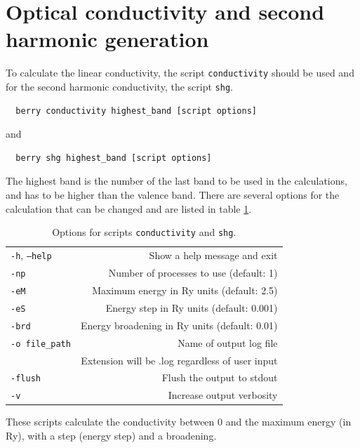 \documentclass[a4paper,12pt]{report}
\begin{document}
\section{Optical conductivity and second harmonic generation}

To calculate the linear conductivity, the script \texttt{conductivity} should be used
and for the second harmonic conductivity, the script \texttt{shg}.
\begin{verbatim}
  berry conductivity highest_band [script options]
 \end{verbatim}
 and
 \begin{verbatim}
  berry shg highest_band [script options]
 \end{verbatim}

The highest band is the number of the last band to be used in the calculations,
and has to be higher than the valence band.
There are several options for the calculation that can be changed and are listed in
table \ref{tab:options_conductivity}.


\begin{table}[ht]
 \centering
 \caption{Options for scripts \texttt{conductivity} and \texttt{shg}.}\label{tab:options_conductivity}
\begin{tabular}[]{lr}
\hline
  \texttt{-h}, \texttt{--help}  & Show a help message and exit \\
  \texttt{-np}                  & Number of processes to use (default: 1) \\
  \texttt{-eM}                  & Maximum energy in Ry units (default: 2.5) \\
  \texttt{-eS}                  & Energy step in Ry units (default: 0.001) \\
  \texttt{-brd}                 & Energy broadening in Ry units (default: 0.01) \\
  \texttt{-o file\_path}        & Name of output log file\\
                                & Extension will be .log regardless of user input\\
  \texttt{-flush}               & Flush the output to stdout \\
  \texttt{-v}                   & Increase output verbosity \\
  \hline
\end{tabular}
\end{table}

These scripts calculate the conductivity between 0 and the maximum energy (in Ry),
with a step (energy step) and a broadening.
\end{document}
